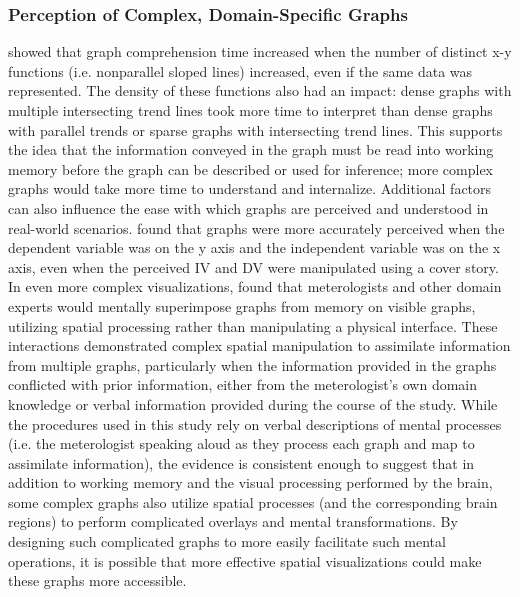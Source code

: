 \documentclass[11pt]{isuthesis}\usepackage[]{graphicx}\usepackage[]{color}
\begin{document}
\subsubsection{Perception of Complex, Domain-Specific Graphs}
\citet{carpenter1998model} showed that graph comprehension time increased when the number of distinct x-y  functions (i.e.  nonparallel sloped lines) increased, even if the same data was represented. The density of these functions also had an impact: dense graphs with multiple intersecting trend lines took more time to interpret than dense graphs with parallel trends or sparse graphs with intersecting trend lines. This supports the idea that the information conveyed in the graph must be read into working memory before the graph can be described or used for inference; more complex graphs would take more time to understand and internalize. Additional factors can also influence the ease with which graphs are perceived and understood in real-world scenarios. \citet{gattis1996mapping} found that graphs were more accurately perceived when the dependent variable was on the y axis and the independent variable was on the x axis, even when the perceived IV and DV were manipulated using a cover story. In even more complex visualizations, \citet{trickett2006toward} found that meterologists and other domain experts would mentally superimpose graphs from memory on visible graphs, utilizing spatial processing rather than manipulating a physical interface. These interactions demonstrated complex spatial manipulation to assimilate information from multiple graphs, particularly when the information provided in the graphs conflicted with prior information, either from the meterologist's own domain knowledge or verbal information provided during the course of the study. While the procedures used in this study rely on verbal descriptions of mental processes (i.e. the meterologist speaking aloud as they process each graph and map to assimilate information), the evidence is consistent enough to suggest that in addition to working memory and the visual processing performed by the brain, some complex graphs also utilize spatial processes (and the corresponding brain regions) to perform complicated overlays and mental transformations. By designing such complicated graphs to more easily facilitate such mental operations, it is possible that more effective spatial visualizations could make these graphs more accessible. 
\end{document}
